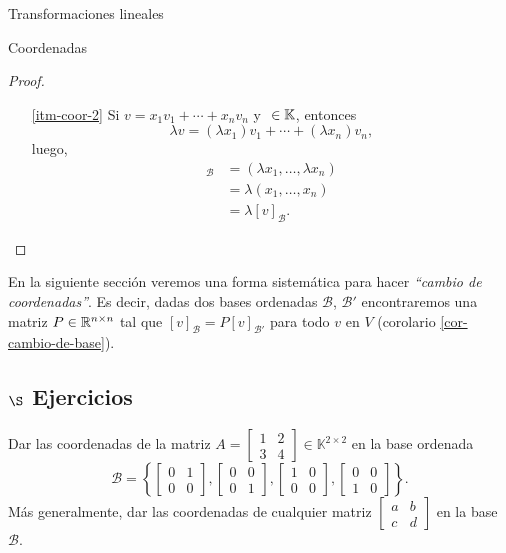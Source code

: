 \begin{chapter}{Transformaciones lineales}
\begin{section}{Coordenadas}
\begin{proof}
\begin{enumerate}
            \item[\ref{itm-coor-2}] Si $v = x_1v_1 + \cdots +x_nv_n$ y $\ \in \mathbb K$, entonces 
            $$
            \lambda v = (\lambda x_1)v_1 + \cdots +(\lambda x_n)v_n,
            $$
            luego,
            \begin{align*}
                [\lambda v ]_\mathcal{B} &= (\lambda x_1,\ldots , \lambda x_n )\\
            &= \lambda (x_1,\ldots ,x_n) \\
            &= \lambda [v]_\mathcal{B}.
            \end{align*}
        \end{enumerate}
    \end{proof}

    \begin{observacion*}
        En la siguiente sección veremos una forma sistemática para hacer \textit{``cambio de coordenadas''}. Es decir,  dadas dos bases ordenadas $\mathcal{B}$, $\mathcal{B}'$ encontraremos una matriz $P \in \mathbb R^{n \times n}$ tal que $[v]_{\mathcal{B}} = P [v]_{\mathcal{B}'}$ para todo $v$ en $V$ (corolario \ref{cor-cambio-de-base}).
    \end{observacion*}
    
    \subsection*{$\S$ Ejercicios}
    \begin{enumex}
        \item Dar las coordenadas de la matriz
        $A=\begin{bmatrix}1&2\\3&4\end{bmatrix} \in \mathbb{K}^{2\times 2} $ en la base ordenada
        $$
        \mathcal{B}=\left\{
        \begin{bmatrix} 0&1\\0&0 \end{bmatrix},
        \begin{bmatrix} 0&0\\0&1 \end{bmatrix},
        \begin{bmatrix} 1&0\\0&0 \end{bmatrix},
        \begin{bmatrix} 0&0\\1&0 \end{bmatrix}
            \right\}.
        $$
        Más generalmente, dar las coordenadas de cualquier matriz $\begin{bmatrix} a&b\\c&d \end{bmatrix}$ en la base $\mathcal{B}$.


\end{enumex}
\end{section}
\end{chapter}
